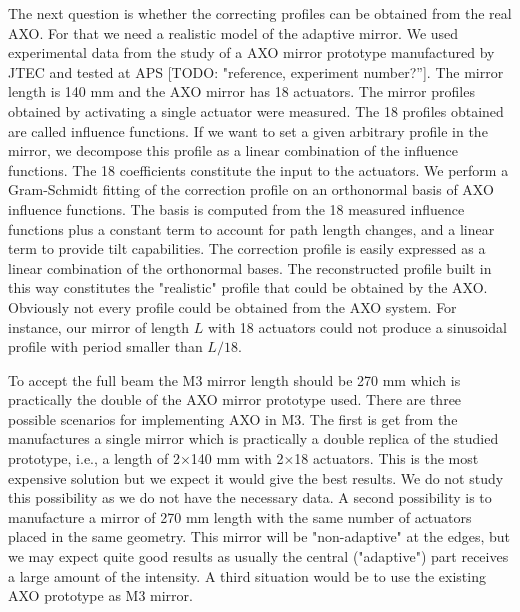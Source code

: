 \documentclass{iucr}              %
\newcommand{\todo}[1]{{\color{red}[TODO: "#1'']}}
\newcommand{\inred}[1]{{\color{red}#1}}
\begin{document}
The next question is whether the correcting profiles can be obtained from the real AXO. For that we need a realistic model of the adaptive mirror.
We used experimental data from the study of a AXO mirror prototype manufactured by JTEC and tested at APS \todo{reference, experiment number?}. The mirror length is \inred{140 mm} and the AXO mirror has 18 actuators. The mirror profiles obtained by activating a single actuator were measured. The 18 profiles obtained are called influence functions. If we want to set a given arbitrary  profile in the mirror, we decompose this profile as a linear combination of the influence functions. The 18 coefficients constitute the input to the actuators.  
We perform a Gram-Schmidt fitting of the correction profile on an orthonormal basis of AXO influence functions. The basis is computed from the 18 measured influence functions plus a constant term to account for path length changes, and a linear term to provide tilt capabilities. The correction profile is easily expressed as a linear combination of the orthonormal bases. The reconstructed profile built in this way constitutes the "realistic" profile that could be obtained by the AXO. Obviously not every profile could be obtained from the AXO system. For instance, our mirror of length $L$ with 18 actuators could not produce a sinusoidal profile with period smaller than $L/18$. 

To accept the full beam the M3 mirror length should be 270 mm which is practically the double of the AXO mirror prototype used. There are three possible scenarios for implementing AXO in M3. The first is get from the manufactures a single mirror which is practically a double replica of the studied prototype, i.e., a length of 2$\times$140 mm with 2$\times$18 actuators. This is the most expensive solution but we expect it would give the best results. We do not study this possibility as we do not have the necessary data. A second possibility is to manufacture a mirror of 270 mm length with the same number of actuators placed in the same geometry. This mirror will be "non-adaptive" at the edges, but we may expect quite good results as usually the central ("adaptive") part receives a large amount of the intensity. A third situation would be to use the existing AXO prototype as M3 mirror.  
\end{document}
